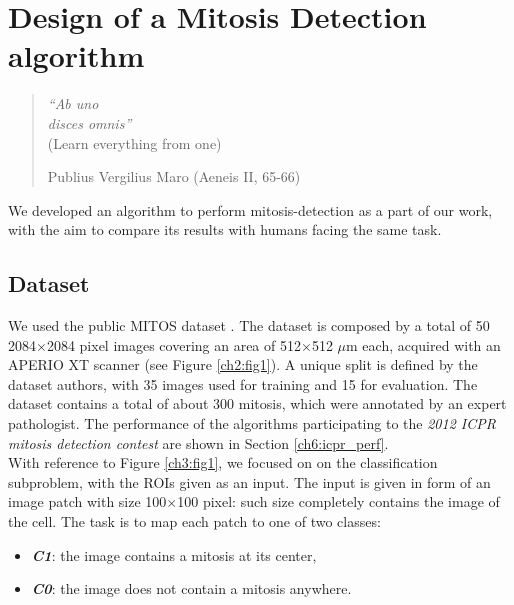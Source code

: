 \chapter{Design of a Mitosis Detection algorithm}
\label{chapter4}
\thispagestyle{empty}

\begin{quotation}
{\footnotesize
\noindent \emph{``Ab uno\\ disces omnis''}\\
\noindent (Learn everything from one)
\begin{flushright}
Publius Vergilius Maro (Aeneis II, 65-66)
\end{flushright}
}
\end{quotation}

\vspace{0.5cm}


We developed an algorithm to perform mitosis-detection as a part of our work, with the aim to compare its results with humans facing the same task.

\section{Dataset}
\label{ch4:ds}

We used the public MITOS dataset \cite{icpr}. The dataset is composed by a total of 50 2084$\times$2084 pixel images
covering an area of 512$\times$512 $\mu$m each, acquired with an APERIO XT scanner (see Figure \ref{ch2:fig1}). 
A unique split is defined by the dataset authors, with 35 images used for training and 15 for evaluation.
The dataset contains a total of about 300 mitosis, which were annotated by an expert pathologist.
The performance of the algorithms participating to the \textit{2012 ICPR mitosis detection contest} are shown in Section \ref{ch6:icpr_perf}.\\
With reference to Figure \ref{ch3:fig1}, we focused on on the classification subproblem, with the \Glspl{ROI} given as an input.
The input is given in form of an image patch with size 100$\times$100 pixel: such size completely contains the image of the cell.
The task is to map each patch to one of two classes:
\begin{itemize}
 \item [] \textit{\textbf{C1}}: the image contains a mitosis at its center,
 \item [] \textit{\textbf{C0}}: the image does not contain a mitosis anywhere. 
\end{itemize}

